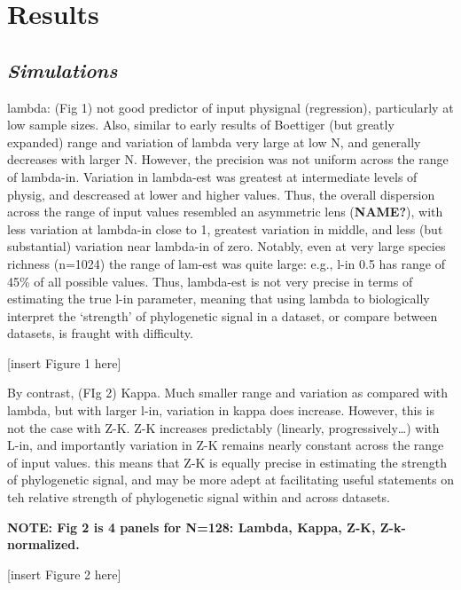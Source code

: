 \documentclass[
]{article}
\begin{document}
\hypertarget{results}{%
\section{Results}\label{results}}

\hypertarget{simulations-1}{%
\subsection{\texorpdfstring{\emph{Simulations}}{Simulations}}\label{simulations-1}}

lambda: (Fig 1) not good predictor of input physignal (regression),
particularly at low sample sizes. Also, similar to early results of
Boettiger (but greatly expanded) range and variation of lambda very
large at low N, and generally decreases with larger N. However, the
precision was not uniform across the range of lambda-in. Variation in
lambda-est was greatest at intermediate levels of physig, and descreased
at lower and higher values. Thus, the overall dispersion across the
range of input values resembled an asymmetric lens (\textbf{NAME?}),
with less variation at lambda-in close to 1, greatest variation in
middle, and less (but substantial) variation near lambda-in of zero.
Notably, even at very large species richness (n=1024) the range of
lam-est was quite large: e.g., l-in 0.5 has range of 45\% of all
possible values. Thus, lambda-est is not very precise in terms of
estimating the true l-in parameter, meaning that using lambda to
biologically interpret the `strength' of phylogenetic signal in a
dataset, or compare between datasets, is fraught with difficulty.
\hfill\break

{[}insert Figure 1 here{]} \hfill\break

By contrast, (FIg 2) Kappa. Much smaller range and variation as compared
with lambda, but with larger l-in, variation in kappa does increase.
However, this is not the case with Z-K. Z-K increases predictably
(linearly, progressively\ldots) with L-in, and importantly variation in
Z-K remains nearly constant across the range of input values. this means
that Z-K is equally precise in estimating the strength of phylogenetic
signal, and may be more adept at facilitating useful statements on teh
relative strength of phylogenetic signal within and across datasets.
\hfill\break

\textbf{NOTE: Fig 2 is 4 panels for N=128: Lambda, Kappa, Z-K,
Z-k-normalized.}

{[}insert Figure 2 here{]} \hfill\break 
\end{document}

